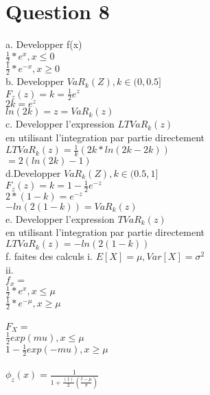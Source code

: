 \section{Question 8}

a. Developper f(x)\\
$\frac{1}{2}*e^{x}, x \le 0$\\
$\frac{1}{2}*e^{-x}, x \geq 0$\\

b. Developper $VaR_k(Z), k \in (0, 0.5]$\\
$F_z(z) = k = \frac{1}{2}e^z$\\
$2k = e^z$\\
$ln(2k) = z = VaR_k(z)$\\

c. Developper l'expression $LTVaR_k(z)$\\
en utilisant l'integration par partie directement\\
$LTVaR_k(z) = \frac{1}{k}(2k*ln(2k-2k))$\\
$ = 2(ln(2k)-1)$\\

d.Developper $VaR_k(Z), k \in (0.5, 1]$\\
 $F_z(z) = k = 1-\frac{1}{2}e^{-z}$\\
 $2*(1-k) = e^{-z}$\\
 $-ln(2(1-k)) =  VaR_k(z)$\\
 
e. Developper l'expression $TVaR_k(z)$\\
en utilisant l'integration par partie directement\\
$LTVaR_k(z) = -ln(2(1-k))$\\
 
f. faites des calculs
i. $E[X] = \mu, Var[X] = \sigma^2$\\
ii. \\
$f_x = $\\
$\frac{1}{2}*e^{x}, x \le \mu$\\
$\frac{1}{2}*e^{-\mu}, x \geq \mu$\\\\
$F_X = $\\
$\frac{1}{2}exp(mu), x \le \mu$\\
$1-\frac{1}{2}exp(-mu), x \ge \mu$\\\\

$\phi_z(x) = \frac{1}{1+\frac{(1)}{2}(\frac{t-\mu}{\sigma})}$